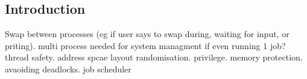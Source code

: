 
\subsection{Introduction}
 
 Swap between processes (eg if user says to swap during, waiting for input, or priting). multi process needed for system managment if even running 1 job? thread safety. address spcae layout randomisation. privilege. memory protection. avaoiding deadlocks. job scheduler
 